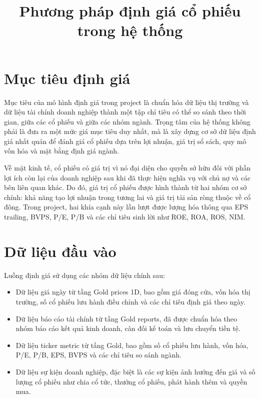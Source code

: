 \documentclass[12pt,a4paper]{article}
\title{\textbf{Phương pháp định giá cổ phiếu trong hệ thống}}
\author{}
\date{}
\begin{document}
\maketitle

\section{Mục tiêu định giá}

Mục tiêu của mô hình định giá trong project là chuẩn hóa dữ liệu thị trường và dữ liệu tài chính doanh nghiệp thành một tập chỉ tiêu có thể so sánh theo thời gian, giữa các cổ phiếu và giữa các nhóm ngành. Trọng tâm của hệ thống không phải là đưa ra một mức giá mục tiêu duy nhất, mà là xây dựng cơ sở dữ liệu định giá nhất quán để đánh giá cổ phiếu dựa trên lợi nhuận, giá trị sổ sách, quy mô vốn hóa và mặt bằng định giá ngành.

Về mặt kinh tế, cổ phiếu có giá trị vì nó đại diện cho quyền sở hữu đối với phần lợi ích còn lại của doanh nghiệp sau khi đã thực hiện nghĩa vụ với chủ nợ và các bên liên quan khác. Do đó, giá trị cổ phiếu được hình thành từ hai nhóm cơ sở chính: khả năng tạo lợi nhuận trong tương lai và giá trị tài sản ròng thuộc về cổ đông. Trong project, hai khía cạnh này lần lượt được lượng hóa thông qua EPS trailing, BVPS, P/E, P/B và các chỉ tiêu sinh lời như ROE, ROA, ROS, NIM.

\section{Dữ liệu đầu vào}

Luồng định giá sử dụng các nhóm dữ liệu chính sau:

\begin{itemize}
    \item Dữ liệu giá ngày từ tầng Gold prices 1D, bao gồm giá đóng cửa, vốn hóa thị trường, số cổ phiếu lưu hành điều chỉnh và các chỉ tiêu định giá theo ngày.
    \item Dữ liệu báo cáo tài chính từ tầng Gold reports, đã được chuẩn hóa theo nhóm báo cáo kết quả kinh doanh, cân đối kế toán và lưu chuyển tiền tệ.
    \item Dữ liệu ticker metric từ tầng Gold, bao gồm số cổ phiếu lưu hành, vốn hóa, P/E, P/B, EPS, BVPS và các chỉ tiêu so sánh ngành.
    \item Dữ liệu sự kiện doanh nghiệp, đặc biệt là các sự kiện ảnh hưởng đến giá và số lượng cổ phiếu như chia cổ tức, thưởng cổ phiếu, phát hành thêm và quyền mua.
\end{itemize}
\end{document}
